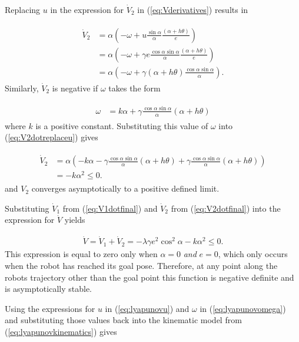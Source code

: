 Replacing $u$ in the expression for $\dot{V}_2$ in (\ref{eq:Vderivatives}) results in

\begin{align}
\label{eq:V2dotreplaceu}
\begin{split}
\dot{V}_2 &= \alpha\left(-\omega+u\frac{\sin\alpha}{\alpha}\frac{(\alpha+h\theta)}{e}\right) \\
&= \alpha\left(-\omega+\gamma e\frac{\cos\alpha\sin\alpha}{\alpha}\frac{(\alpha+h\theta)}{e}\right) \\
&= \alpha\left(-\omega+\gamma(\alpha+h\theta)\frac{\cos\alpha\sin\alpha}{\alpha}\right).
\end{split}
\end{align}
Similarly, $\dot{V}_2$ is negative if $\omega$ takes the form

\begin{align}
\label{eq:lyapunovomega}
\begin{split}
\omega &= k\alpha + \gamma\frac{\cos\alpha\sin\alpha}{\alpha}\left(\alpha+h\theta\right)
\end{split}
\end{align}
where $k$ is a positive constant. Substituting this value of $\omega$ into (\ref{eq:V2dotreplaceu}) gives

\begin{align}
\label{eq:V2dotfinal}
\begin{split}
\dot{V}_2 &= \alpha\left(-k\alpha-\gamma\frac{\cos\alpha\sin\alpha}{\alpha}(\alpha+h\theta) + \gamma\frac{\cos\alpha\sin\alpha}{\alpha}(\alpha+h\theta)\right) \\
&= -k\alpha^2 \leq 0.
\end{split}
\end{align}
and $V_2$ converges asymptotically to a positive defined limit.

Substituting $\dot{V}_1$ from (\ref{eq:V1dotfinal}) and $\dot{V}_2$ from (\ref{eq:V2dotfinal}) into the expression for $\dot{V}$ yields

\begin{align}
\label{eq:Vfinal}
\dot{V} = \dot{V}_1 + \dot{V}_2 = -\lambda\gamma e^2\cos^2\alpha - k\alpha^2 \leq 0.
\end{align}
This expression is equal to zero only when $\alpha=0$ \textit{and} $e=0$, which only occurs when the robot has reached its goal pose. Therefore, at any point along the robots trajectory other than the goal point this function is negative definite and is asymptotically stable.

Using the expressions for $u$ in (\ref{eq:lyapunovu}) and $\omega$ in (\ref{eq:lyapunovomega}) and substituting those values back into the kinematic model from (\ref{eq:lyapunovkinematics}) gives

